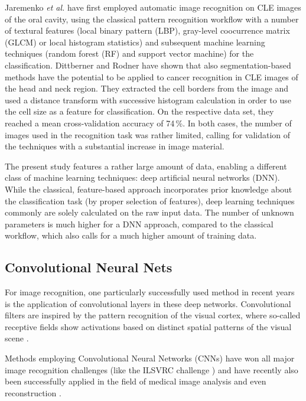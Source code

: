 \documentclass[fleqn,10pt]{wlscirep}
\begin{document}
Jaremenko \textit{et al.} have first employed automatic image recognition on CLE images
of the oral cavity, using the classical pattern recognition
workflow with a number of textural features (local binary pattern
(LBP), gray-level coocurrence matrix (GLCM) or local histogram
statistics) and subsequent machine
learning techniques (random forest (RF) and support vector machine)
for the classification\cite{Jaremenko:2015kh}.
Dittberner \cite{Dittberner:2016jv} and Rodner \cite{Rodner:2015ts}
have shown that also segmentation-based methods have the
potential to be applied to cancer recognition in CLE images of the
head and neck region.  They extracted the cell borders from the image
and used a distance transform with successive histogram calculation in
order to use the cell size as a feature for classification.
On the respective data set, they reached a mean cross-validation accuracy of
74\,\%\cite{Dittberner:2016jv}.
In both cases, the number of images used in the
recognition task was rather limited, calling for validation of the
techniques with a substantial increase in image material.

The present study features a rather large amount of data, enabling
a different class of machine learning techniques: deep
artificial neural networks (DNN).
While the classical, feature-based
approach incorporates prior knowledge about the classification task
(by proper selection of features), deep learning techniques commonly
are solely calculated on the raw input data. The number of unknown
parameters is much higher for a DNN approach, compared to the
classical workflow, which also calls for a much higher amount of
training data.



\subsection{Convolutional Neural Nets}
For image recognition, one
particularly successfully used method in recent years is the
application of convolutional layers in these deep networks. Convolutional
filters are inspired by the pattern recognition of the
visual cortex, where so-called receptive fields show activations based
on distinct spatial patterns of the visual scene \cite{Hubel:1968ep}.


Methods employing Convolutional Neural Networks (CNNs) have won all
major image recognition challenges (like the ILSVRC challenge
\cite{Russakovsky:2015bu}) and have recently also been successfully
applied in the field of medical image analysis
\cite{Shin:2016cx,Roth:2016eg,Esteva:2017ct,Litjens:2016fr} and even reconstruction \cite{Wurfl:2016jq}.
\end{document}
